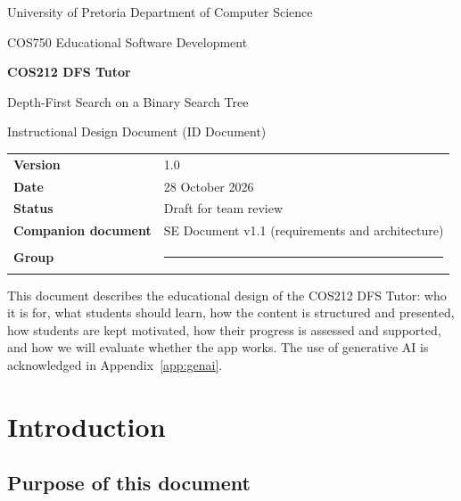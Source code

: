 \documentclass[11pt,a4paper]{article}
\begin{document}
\begin{titlepage}
  \centering
  \vspace*{2.5cm}
  {\large University of Pretoria \textperiodcentered{} Department of Computer Science\par}
  \vspace{0.3cm}
  {\large COS750 Educational Software Development\par}
  \vspace{2.2cm}
  {\Huge\bfseries COS212 DFS Tutor\par}
  \vspace{0.5cm}
  {\Large Depth-First Search on a Binary Search Tree\par}
  \vspace{0.3cm}
  {\large Instructional Design Document (ID Document)\par}
  \vspace{2.5cm}
  \begin{tabular}{@{}ll@{}}
    \textbf{Version} & 1.0 \\
    \textbf{Date} & 28 October 2026 \\
    \textbf{Status} & Draft for team review \\
    \textbf{Companion document} & SE Document v1.1 (requirements and architecture) \\
    \textbf{Group} & \rule{6cm}{0.4pt} \\
  \end{tabular}
  \vfill
  {\small This document describes the educational design of the COS212 DFS Tutor: who it is for,
  what students should learn, how the content is structured and presented, how students are
  kept motivated, how their progress is assessed and supported, and how we will evaluate whether
  the app works. The use of generative AI is acknowledged in Appendix~\ref{app:genai}.\par}
\end{titlepage}

\tableofcontents
\newpage

\section{Introduction}

\subsection{Purpose of this document}
\end{document}
